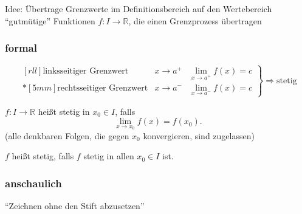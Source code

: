 Idee: Übertrage Grenzwerte im Definitionsbereich auf den Wertebereich\\
"`gutmütige"' Funktionen $f: I \to \mathbb{R}$, die einen Grenzprozess übertragen

\subsubsection*{formal}
\begin{equation*}
  \left.
  \begin{matrix}[rll]
    \text{linksseitiger Grenzwert} & x \longrightarrow a^+ & \displaystyle\lim_{x \rightarrow a^+} f(x) = c \\*[5mm]
    \text{rechtsseitiger Grenzwert} & x \longrightarrow a^- & \displaystyle\lim_{x \rightarrow a^-} f(x) = c
  \end{matrix}
  \right\}\Rightarrow \text{stetig}
\end{equation*}

\begin{definition}[Stetigkeit]
  $f: I \to \mathbb{R}$ heißt stetig in $x_0 \in I$, falls \begin{equation*} \lim_{x\rightarrow x_0} f(x) = f(x_0). \end{equation*} (alle denkbaren Folgen, die gegen $x_0$ konvergieren, sind zugelassen)

  $f$ heißt stetig, falls $f$ stetig in allen $x_0 \in I$ ist.
\end{definition}

\subsubsection*{anschaulich}
"`Zeichnen ohne den Stift abzusetzen"'

\begin{center}

\end{center}


